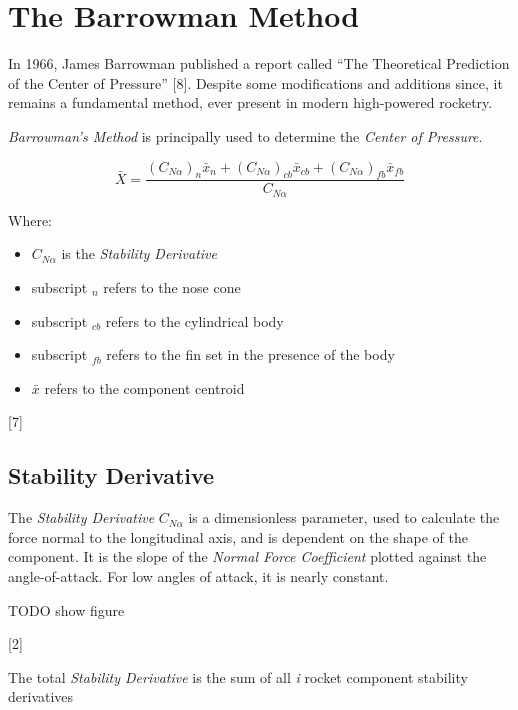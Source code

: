\documentclass[]{article}
\providecommand{\tightlist}{%
  \setlength{\itemsep}{0pt}\setlength{\parskip}{0pt}}
\begin{document}
\clearpage

\section{The Barrowman Method}\label{the-barrowman-method}

In 1966, James Barrowman published a report called ``The Theoretical
Prediction of the Center of Pressure'' {[}8{]}. Despite some
modifications and additions since, it remains a fundamental method, ever
present in modern high-powered rocketry.

\emph{Barrowman's Method} is principally used to determine the
\emph{Center of Pressure}.

\begin{equation}
\label{rocket_center_of_pressure}
\bar{X} = 
\dfrac
{ \left( C_{N \alpha} \right)_n \bar{x}_n + \left( C_{N \alpha} \right)_{cb} \bar{x}_{cb} + \left( C_{N \alpha} \right)_{fb} \bar{x}_{fb} }
{ C_{N \alpha}  }
\end{equation}

Where:

\begin{itemize}
\tightlist
\item
  \(C_{N \alpha}\) is the \emph{Stability Derivative}
\item
  subscript \(_n\) refers to the nose cone
\item
  subscript \(_{cb}\) refers to the cylindrical body
\item
  subscript \(_{fb}\) refers to the fin set in the presence of the body
\item
  \(\bar{x}\) refers to the component centroid
\end{itemize}

{[}7{]}

\subsection{Stability Derivative}\label{stability-derivative}

The \emph{Stability Derivative} \(C_{N\alpha}\) is a dimensionless
parameter, used to calculate the force normal to the longitudinal axis,
and is dependent on the shape of the component. It is the slope of the
\emph{Normal Force Coefficient} plotted against the angle-of-attack. For
low angles of attack, it is nearly constant.

TODO show figure

{[}2{]}

The total \emph{Stability Derivative} is the sum of all \emph{i} rocket
component stability derivatives
\end{document}
